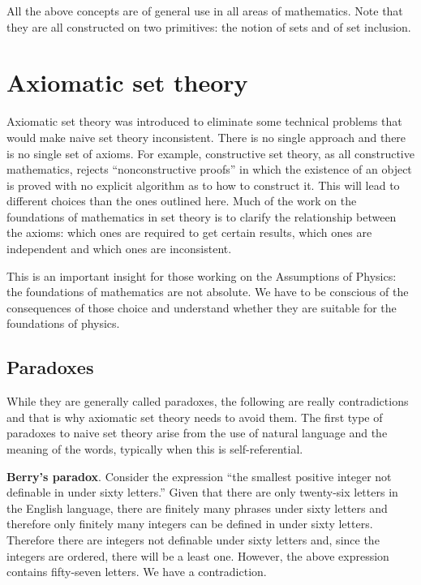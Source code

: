 \documentclass{article}
\begin{document}
\begin{remark}
	All the above concepts are of general use in all areas of mathematics. Note that they are all constructed on two primitives: the notion of sets and of set inclusion.
\end{remark}

\section{Axiomatic set theory}

Axiomatic set theory was introduced to eliminate some technical problems that would make naive set theory inconsistent. There is no single approach and there is no single set of axioms. For example, constructive set theory, as all constructive mathematics, rejects ``nonconstructive proofs'' in which the existence of an object is proved with no explicit algorithm as to how to construct it. This will lead to different choices than the ones outlined here. Much of the work on the foundations of mathematics in set theory is to clarify the relationship between the axioms: which ones are required to get certain results, which ones are independent and which ones are inconsistent.

This is an important insight for those working on the Assumptions of Physics: the foundations of mathematics are not absolute. We have to be conscious of the consequences of those choice and understand whether they are suitable for the foundations of physics.

\subsection{Paradoxes}

While they are generally called paradoxes, the following are really contradictions and that is why axiomatic set theory needs to avoid them. The first type of paradoxes to naive set theory arise from the use of natural language and the meaning of the words, typically when this is self-referential.

\textbf{Berry's paradox}. Consider the expression ``the smallest positive integer not definable in under sixty letters.'' Given that there are only twenty-six letters in the English language, there are finitely many phrases under sixty letters and therefore only finitely many integers can be defined in under sixty letters. Therefore there are integers not definable under sixty letters and, since the integers are ordered, there will be a least one. However, the above expression contains fifty-seven letters. We have a contradiction.
\end{document}
